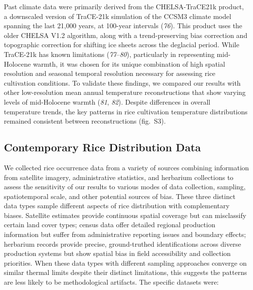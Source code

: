 \documentclass[
  letterpaper,
  DIV=11,
  numbers=noendperiod]{scrartcl}
\begin{document}
Past climate data were primarily derived from the CHELSA-TraCE21k
product, a downscaled version of TraCE-21k simulation of the CCSM3
climate model spanning the last 21,000 years, at 100-year intervals
(\emph{76}). This product uses the older CHELSA V1.2 algorithm, along
with a trend-preserving bias correction and topographic correction for
shifting ice sheets across the deglacial period. While TraCE-21k has
known limitations (\emph{77}--\emph{80}), particularly in representing
mid-Holocene warmth, it was chosen for its unique combination of high
spatial resolution and seasonal temporal resolution necessary for
assessing rice cultivation conditions. To validate these findings, we
compared our results with other low-resolution mean annual temperature
reconstructions that show varying levels of mid-Holocene warmth
(\emph{81}, \emph{82}). Despite differences in overall temperature
trends, the key patterns in rice cultivation temperature distributions
remained consistent between reconstructions (fig.~S3).

\subsection{Contemporary Rice Distribution
Data}\label{contemporary-rice-distribution-data}

We collected rice occurrence data from a variety of sources combining
information from satellite imagery, administrative statistics, and
herbarium collections to assess the sensitivity of our results to
various modes of data collection, sampling, spatiotemporal scale, and
other potential sources of bias. These three distinct data types sample
different aspects of rice distribution with complementary biases.
Satellite estimates provide continuous spatial coverage but can
misclassify certain land cover types; census data offer detailed
regional production information but suffer from administrative reporting
issues and boundary effects; herbarium records provide precise,
ground-truthed identifications across diverse production systems but
show spatial bias in field accessibility and collection priorities. When
these data types with different sampling approaches converge on similar
thermal limits despite their distinct limitations, this suggests the
patterns are less likely to be methodological artifacts. The specific
datasets were:
\end{document}
